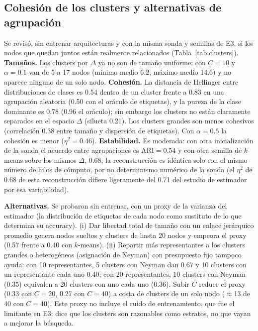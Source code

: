 \documentclass[11pt,a4paper]{article}
\begin{document}
\subsection{Cohesión de los clusters y alternativas de agrupación}\label{sec:clusters}
Se revisó, sin entrenar arquitecturas y con la misma sonda y semillas de E3, si los nodos que quedan juntos están realmente relacionados (Tabla~\ref{tab:clusters}). \textbf{Tamaños.} Los clusters por $\Delta$ ya no son de tamaño uniforme: con $C=10$ y $\alpha=0.1$ van de 5 a 17 nodos (mínimo medio 6.2, máximo medio 14.6) y no aparece ninguno de un solo nodo. \textbf{Cohesión.} La distancia de Hellinger entre distribuciones de clases es 0.54 dentro de un cluster frente a 0.83 en una agrupación aleatoria (0.50 con el oráculo de etiquetas), y la pureza de la clase dominante es 0.78 (0.96 el oráculo); sin embargo los clusters no están claramente separados en el espacio $\Delta$ (silueta 0.21). Los clusters grandes son menos cohesivos (correlación 0.38 entre tamaño y dispersión de etiquetas). Con $\alpha=0.5$ la cohesión es menor ($\eta^2=0.46$). \textbf{Estabilidad.} Es moderada: con otra inicialización de la sonda el acuerdo entre agrupaciones es $\mathrm{ARI}=0.54$ y con otra semilla de $k$-means sobre los mismos $\Delta$, 0.68; la reconstrucción es idéntica solo con el mismo número de hilos de cómputo, por no determinismo numérico de la sonda (el $\eta^2$ de 0.68 de esta reconstrucción difiere ligeramente del 0.71 del estudio de estimador por esa variabilidad).

\textbf{Alternativas.} Se probaron sin entrenar, con un proxy de la varianza del estimador (la distribución de etiquetas de cada nodo como sustituto de lo que determina su accuracy). (i) Dar libertad total de tamaño con un enlace jerárquico promedio genera nodos sueltos y clusters de hasta 20 nodos y empeora el proxy (0.57 frente a 0.40 con $k$-means). (ii) Repartir más representantes a los clusters grandes o heterogéneos (asignación de Neyman) con presupuesto fijo tampoco ayuda: con 10 representantes, 5 clusters con Neyman dan 0.67 y 10 clusters con un representante cada uno 0.40; con 20 representantes, 10 clusters con Neyman (0.35) equivalen a 20 clusters con uno cada uno (0.36). Subir $C$ reduce el proxy (0.33 con $C=20$, 0.27 con $C=40$) a costa de clusters de un solo nodo ($\approx$13 de 40 con $C=40$). Este proxy no incluye el ruido de entrenamiento, que fue el limitante en E3: dice que los clusters son razonables como estratos, no que vayan a mejorar la búsqueda.
\end{document}
